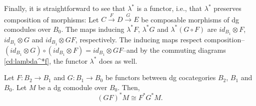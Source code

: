 Finally, it is straightforward to see that $\lambda^*$ 
is a functor, i.e., that $\lambda^*$ preserves composition
of morphisms: Let $C \overset{F}{\to} D \overset{G}{\to} E$ be 
composable morphisms of dg comodules over $B_0$. 
The maps inducing 
$\lambda^*F$, $\lambda^*G$ and $\lambda^*(G\circ F)$ are 
$id_{B_1}\otimes F$, $id_{B_1}\otimes G$ and 
$id_{B_1}\otimes GF$, respectively. The inducing maps
respect composition--$(id_{B_1}\otimes G) \circ 
(id_{B_1}\otimes F) = id_{B_1}\otimes GF$--and by 
the commuting diagrams \ref{cd:lambda^*f}, the 
functor $\lambda^*$ does as well.
%
\begin{prop} \label{prop:pbs_compose}
Let $F:B_2 \to B_1$ and $G: B_1 \to B_0$ 
be functors between dg cocategories $B_2$, $B_1$ and 
$B_0$. Let $M$ be a dg comodule over $B_0$. Then,
$$
(GF)^*M \cong F^*G^*M.
$$
\end{prop}
%
